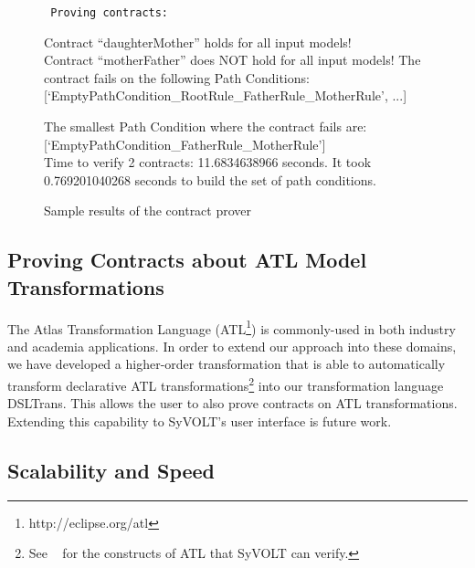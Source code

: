 \begin{figure}

\scriptsize
\tt
Proving contracts:

Contract ``daughterMother'' holds for all input models!
\\
Contract ``motherFather'' does NOT hold for all input models! The contract fails on the following Path Conditions:
[`EmptyPathCondition\_RootRule\_FatherRule\_MotherRule', ...]

The smallest Path Condition where the contract fails are:
[`EmptyPathCondition\_FatherRule\_MotherRule']
\\
Time to verify 2 contracts: 11.6834638966 seconds.
It took 0.769201040268 seconds to build the set of path conditions.
\caption{Sample results of the contract prover}
\label{fig:output}
\end{figure}

\subsection{Proving Contracts about ATL Model Transformations}
The Atlas Transformation Language (ATL\footnote{http://eclipse.org/atl}) is
commonly-used in both industry and academia applications. In order to extend our approach into these domains, we
have developed a higher-order transformation that is able to automatically
transform declarative ATL transformations\footnote{See ~\cite{Oakes} for the
constructs of ATL that SyVOLT can verify.} into our transformation language
DSLTrans. This allows the user to also prove contracts on ATL transformations. Extending this capability to SyVOLT's user interface is
future work.

\subsection{Scalability and Speed}

